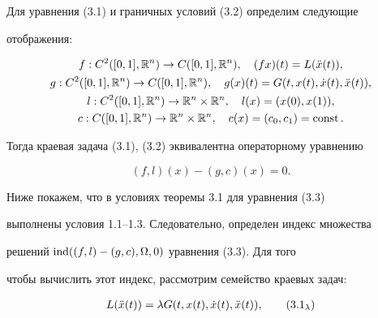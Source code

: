 \begin{pf}


Для уравнения (3.1) и граничных условий (3.2) определим следующие 


отображения:


\begin{gather*}


f:C^2([0,1],{\Bbb R}^n)\rightarrow C([0,1],{\Bbb R}^n),\quad 


(f x)(t)=L(\Ddot x(t)), \\


%


g:C^2([0,1],{\Bbb R}^n)\rightarrow C([0,1],{\Bbb R}^n),\quad 


g(x)(t)=G(t, x(t), \Dot x(t), \Ddot x(t)), \\


%


l:C^2([0,1],{\Bbb R}^n)\rightarrow {\Bbb R}^n \times {\Bbb R}^n,\quad


l(x)=(x(0), x(1)), \\


%


c:C([0,1], {\Bbb R}^n)\rightarrow {\Bbb R}^n \times {\Bbb R}^n, \quad


c(x)= (c_0, c_1)=\const.


\end{gather*}


Тогда краевая задача (3.1), (3.2) эквивалентна операторному уравнению 


\begin{equation}


(f, l)(x) - (g, c)(x) = 0.


\end{equation}





Ниже покажем, что в условиях теоремы 3.1 для уравнения (3.3) 


выполнены условия 1.1--1.3. Следовательно, определен индекс множества


решений $\operatorname{ind} ((f,l)-(g,c),\Omega, 0)$ уравнения (3.3). Для того


чтобы вычислить этот индекс, рассмотрим семейство краевых задач:


\begin{gather}


L(\Ddot x(t))=\lambda G(t, x(t), \Dot x(t), \Ddot x(t)),


\tag{3.1$_\lambda$} \\



\end{gather}
\end{pf}
